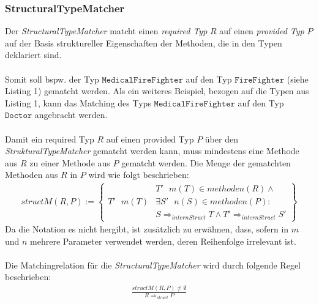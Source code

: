\documentclass[a4paper,12pt]{article}
\begin{document}
\subsubsection{StructuralTypeMatcher} 
Der \emph{StructuralTypeMatcher} matcht einen \emph{required Typ} $R$ auf einen \emph{provided Typ} $P$ auf der Basis struktureller Eigenschaften der Methoden, die in den Typen deklariert sind. 
\\\\
Somit soll bspw. der Typ $\texttt{MedicalFireFighter}$ auf den Typ $\texttt{FireFighter}$ (siehe Listing 1) gematcht werden. Als ein weiteres Beispiel, bezogen auf die Typen aus Listing 1, kann das Matching des Typs $\texttt{MedicalFireFighter}$ auf den Typ $\texttt{Doctor}$ angebracht werden.
\\\\
Damit ein required Typ $R$ auf einen provided Typ $P$ über den \emph{StrukturalTypeMatcher} gematcht werden kann, muss mindestens eine Methode aus $R$ zu einer Methode aus $P$ gematcht werden. Die Menge der gematchten Methoden aus $R$ in $P$ wird wie folgt beschrieben:
\begin{gather*}
structM(R,P) := \left\{ 
				\begin{array}{l|l}
				& \mathit{T'\text{ }m(T)} \in \mathit{methoden(R)} \wedge \mathit{ }\\
T'\text{ }m(T)	& \exists \mathit{S'\text{ }n(S)} \in \mathit{methoden(P)} :\\								 				&  S\Rightarrow_{internStruct}T \wedge T' \Rightarrow_{internStruct}S' 
				\end{array}
              \right\}
\end{gather*}
Da die Notation es nicht hergibt, ist zusätzlich zu erwähnen, dass, sofern in $m$ und $n$ mehrere Parameter verwendet werden, deren Reihenfolge irrelevant ist.\\\\
Die Matchingrelation für die \emph{StructuralTypeMatcher} wird durch folgende Regel beschrieben:
\begin{gather*}
\frac{structM(R,P) \neq \emptyset}{R \Rightarrow_{struct}P}
\end{gather*}
\end{document}
